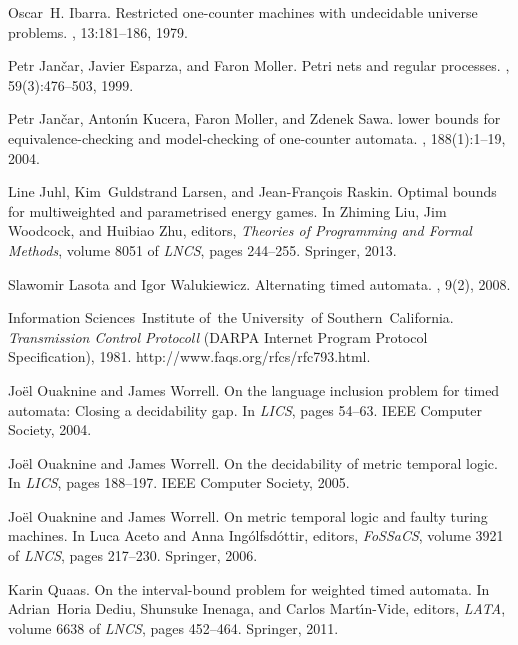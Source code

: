 \documentclass{CSML}
\theoremstyle{plain}\newtheorem{theorem}[thm]{Theorem}
\theoremstyle{plain}\newtheorem{corollary}[thm]{Corollary}
\theoremstyle{plain}\newtheorem{example}[thm]{Example}
\theoremstyle{plain}\newtheorem{lemma}[thm]{Lemma}
\theoremstyle{plain}\newtheorem{remark}[thm]{Remark}
\begin{document}
\begin{thebibliography}{Kos97}
Oscar~H. Ibarra.
\newblock Restricted one-counter machines with undecidable universe problems.
, 13:181--186, 1979.

Petr Jan\v{c}ar, Javier Esparza, and Faron Moller.
\newblock Petri nets and regular processes.
, 59(3):476--503, 1999.

Petr Jan\v{c}ar, Anton\'{\i}n Kucera, Faron Moller, and Zdenek Sawa.
 lower bounds for equivalence-checking and model-checking of
  one-counter automata.
, 188(1):1--19, 2004.

Line Juhl, Kim~Guldstrand Larsen, and Jean-Fran\c{c}ois Raskin.
\newblock Optimal bounds for multiweighted and parametrised energy games.
\newblock In Zhiming Liu, Jim Woodcock, and Huibiao Zhu, editors, {\em Theories
  of Programming and Formal Methods}, volume 8051 of {\em LNCS}, pages
  244--255. Springer, 2013.

Slawomir Lasota and Igor Walukiewicz.
\newblock Alternating timed automata.
, 9(2), 2008.

Information Sciences~Institute of~the University~of Southern~California.
\newblock \emph{Transmission Control Protocoll} ({DARPA} {I}nternet {P}rogram
  {P}rotocol {S}pecification), 1981.
\newblock http://www.faqs.org/rfcs/rfc793.html.

Jo{\"e}l Ouaknine and James Worrell.
\newblock On the language inclusion problem for timed automata: Closing a
  decidability gap.
\newblock In {\em LICS}, pages 54--63. IEEE Computer Society, 2004.

Jo{\"e}l Ouaknine and James Worrell.
\newblock On the decidability of metric temporal logic.
\newblock In {\em LICS}, pages 188--197. IEEE Computer Society, 2005.

Jo{\"e}l Ouaknine and James Worrell.
\newblock On metric temporal logic and faulty turing machines.
\newblock In Luca Aceto and Anna Ing{\'o}lfsd{\'o}ttir, editors, {\em FoSSaCS},
  volume 3921 of {\em LNCS}, pages 217--230. Springer, 2006.

Karin Quaas.
\newblock On the interval-bound problem for weighted timed automata.
\newblock In Adrian~Horia Dediu, Shunsuke Inenaga, and Carlos Mart\'{\i}n-Vide,
  editors, {\em LATA}, volume 6638 of {\em LNCS}, pages 452--464. Springer,
  2011.


\end{thebibliography}
\end{document}

